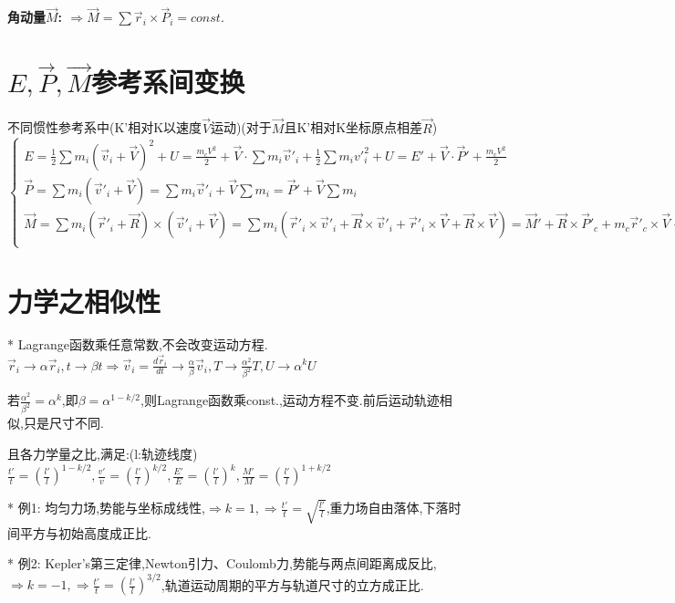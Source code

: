         \bf{角动量$\vec M$: }
            $\Rightarrow \vec M = \sum \vec r_i \times \vec P_i = const.$


    \section{$E,\vec P,\vec M$参考系间变换}
        不同惯性参考系中(K'相对K以速度$\vec V$运动)(对于$\vec M$且K'相对K坐标原点相差$\vec R$)\\
            $
                \left\{ \begin{array}{ll}
                E = \frac{1}{2} \sum m_i(\vec v_i + \vec V)^2 + U = \frac{m_c V^2}{2} + \vec V \cdot \sum m_i \vec v'_i + \frac{1}{2} \sum m_i v'_i^2 + U = E' + \vec V \cdot \vec P' + \frac{m_c V^2}{2}\\
                \vec P = \sum m_i (\vec v'_i + \vec V) = \sum m_i \vec v'_i + \vec V \sum m_i = \vec P' + \vec V \sum m_i\\
                \vec M = \sum m_i (\vec r'_i + \vec R) \times (\vec v'_i + \vec V) = \sum m_i( \vec r'_i \times \vec v'_i +  \vec R \times \vec v'_i + \vec r'_i \times \vec V + \vec R \times \vec V)
             = \vec M' + \vec R \times \vec P'_c + m_c \vec r'_c \times \vec V + m_c \vec R \times \vec V\\
                \end{array} \right.
            $


\section{力学之相似性}
    * Lagrange函数乘任意常数,不会改变运动方程.
        $\vec r_i \to \alpha \vec r_i, t \to \beta t 
        \Rightarrow \vec v_i = \frac{d\vec r_i}{dt} \to \frac{\alpha}{\beta}\vec v_i,T \to \frac{\alpha^2}{\beta^2}T,U \to  \alpha^k U$
    
    若$\frac{\alpha^2}{\beta^2} = \alpha ^ k $,即$\beta = \alpha^{1-k/2}$,则Lagrange函数乘const.,运动方程不变.前后运动轨迹相似,只是尺寸不同.
    
    且各力学量之比,满足:\quad(l:轨迹线度)
        $\frac{t'}{t} = (\frac{l'}{l})^{1-k/2},\frac{v'}{v} = (\frac{l'}{l})^{k/2},\frac{E'}{E} = (\frac{l'}{l})^k,\frac{M'}{M} = (\frac{l'}{l})^{1+k/2}$
        
    * 例1: 均匀力场,势能与坐标成线性,$\Rightarrow k=1,\Rightarrow \frac{t'}{t} = \sqrt{\frac{l'}{l}}$,重力场自由落体,下落时间平方与初始高度成正比.
    
    * 例2: Kepler's第三定律,Newton引力、Coulomb力,势能与两点间距离成反比,$\Rightarrow k=-1,\Rightarrow \frac{t'}{t} = (\frac{l'}{l})^{3/2}$,轨道运动周期的平方与轨道尺寸的立方成正比.


